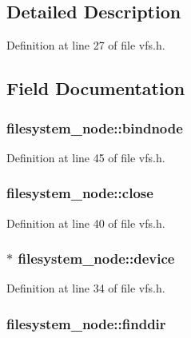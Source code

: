 \subsection{Detailed Description}


Definition at line 27 of file vfs.h.



\subsection{Field Documentation}
\hypertarget{structfilesystem__node_acfa8d590a2f85e52e5653e6616a1019f}{
\subsubsection[{bindnode}]{ {\bf filesystem\_\-node::bindnode}}}
\label{structfilesystem__node_acfa8d590a2f85e52e5653e6616a1019f}


Definition at line 45 of file vfs.h.

\hypertarget{structfilesystem__node_af6ffe9e86be2473a7e7d250cc428f682}{
\subsubsection[{close}]{ {\bf filesystem\_\-node::close}}}
\label{structfilesystem__node_af6ffe9e86be2473a7e7d250cc428f682}


Definition at line 40 of file vfs.h.

\hypertarget{structfilesystem__node_abbd4a067154755521156cf66afec15b6}{
\subsubsection[{device}]{$\ast$ {\bf filesystem\_\-node::device}}}
\label{structfilesystem__node_abbd4a067154755521156cf66afec15b6}


Definition at line 34 of file vfs.h.

\hypertarget{structfilesystem__node_a60a6af56c8e909f3de33a189309f2444}{
\subsubsection[{finddir}]{ {\bf filesystem\_\-node::finddir}}}
\label{structfilesystem__node_a60a6af56c8e909f3de33a189309f2444}


